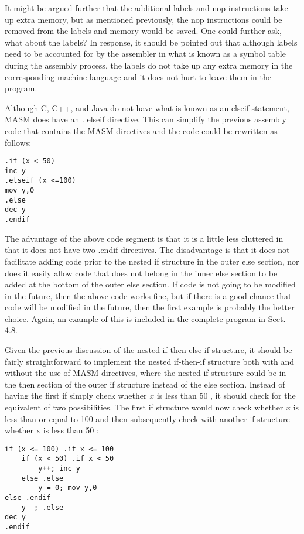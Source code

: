 \documentclass[10pt]{article}
\begin{document}
It might be argued further that the additional labels and nop instructions take up extra memory, but as mentioned previously, the nop instructions could be removed from the labels and memory would be saved. One could further ask, what about the labels? In response, it should be pointed out that although labels need to be accounted for by the assembler in what is known as a symbol table during the assembly process, the labels do not take up any extra memory in the corresponding machine language and it does not hurt to leave them in the program.

Although C, C++, and Java do not have what is known as an elseif statement, MASM does have an . elseif directive. This can simplify the previous assembly code that contains the MASM directives and the code could be rewritten as follows:

\begin{verbatim}
.if (x < 50)
inc y
.elseif (x <=100)
mov y,0
.else
dec y
.endif
\end{verbatim}

The advantage of the above code segment is that it is a little less cluttered in that it does not have two .endif directives. The disadvantage is that it does not facilitate adding code prior to the nested if structure in the outer else section, nor does it easily allow code that does not belong in the inner else section to be added at the bottom of the outer else section. If code is not going to be modified in the future, then the above code works fine, but if there is a good chance that code will be modified in the future, then the first example is probably the better choice. Again, an example of this is included in the complete program in Sect. 4.8.

Given the previous discussion of the nested if-then-else-if structure, it should be fairly straightforward to implement the nested if-then-if structure both with and without the use of MASM directives, where the nested if structure could be in the then section of the outer if structure instead of the else section. Instead of having the first if simply check whether $x$ is less than 50 , it should check for the equivalent of two possibilities. The first if structure would now check whether $x$ is less than or equal to 100 and then subsequently check with another if structure whether x is less than 50 :

\begin{verbatim}
if (x <= 100) .if x <= 100
    if (x < 50) .if x < 50
        y++; inc y
    else .else
        y = 0; mov y,0
else .endif
    y--; .else
dec y
.endif
\end{verbatim}
\end{document}

